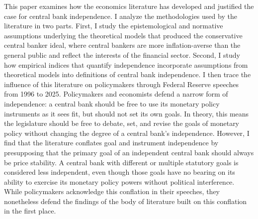 \documentclass[12pt,a4paper]{article}
\begin{document}
\begin{doublespace}
This paper examines how the economics literature has developed and justified the case for central bank independence. I analyze the methodologies used by the literature in two parts. First, I study the epistemological and normative assumptions underlying the theoretical models that produced the conservative central banker ideal, where central bankers are more inflation-averse than the general public and reflect the interests of the financial sector. Second, I study how empirical indices that quantify independence incorporate assumptions from theoretical models into definitions of central bank independence. I then trace the influence of this literature on policymakers through Federal Reserve speeches from 1996 to 2025. Policymakers and economists defend a narrow form of independence: a central bank should be free to use its monetary policy instruments as it sees fit, but should not set its own goals. In theory, this means the legislature should be free to debate, set, and revise the goals of monetary policy without changing the degree of a central bank's independence. However, I find that the literature conflates goal and instrument independence by presupposing that the primary goal of an independent central bank should always be price stability. A central bank with different or multiple statutory goals is considered less independent, even though those goals have no bearing on its ability to exercise its monetary policy powers without political interference. While policymakers acknowledge this conflation in their speeches, they nonetheless defend the findings of the body of literature built on this conflation in the first place.

\newpage



\tableofcontents
\newpage


\setcounter{page}{1}
%
%
%
%
%




\end{doublespace}
\end{document}
